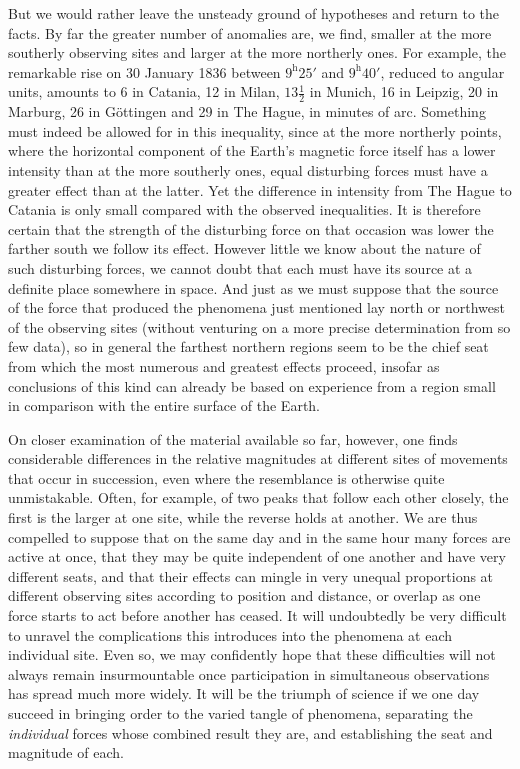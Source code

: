 But we would rather leave the unsteady ground of hypotheses and return to the facts. By far the greater number of anomalies are, we find, smaller at the more southerly observing sites and larger at the more northerly ones. For example, the remarkable rise on 30 January 1836 between $9^{\mathrm h}25'$ and $9^{\mathrm h}40'$, reduced to angular units, amounts to 6 in Catania, 12 in Milan, $13\frac12$ in Munich, 16 in Leipzig, 20 in Marburg, 26 in Göttingen and 29 in The Hague, in minutes of arc. Something must indeed be allowed for in this inequality, since at the more northerly points, where the horizontal component of the Earth’s magnetic force itself has a lower intensity than at the more southerly ones, equal disturbing forces must have a greater effect than at the latter. Yet the difference in intensity from The Hague to Catania is only small compared with the observed inequalities. It is therefore certain that
the strength of the disturbing force on that occasion was lower the farther south we follow its effect. However little we know about the nature of such disturbing forces, we cannot doubt that each must have its source at a definite place somewhere in space. And just as we must suppose that the source of the force that produced the phenomena just mentioned lay north or northwest of the observing sites (without venturing on a more precise determination from so few data), so in general the farthest northern regions seem to be the chief seat from which the most numerous and greatest effects proceed, insofar as conclusions of this kind can already be based on experience from a region small in comparison with the entire surface of the Earth.

On closer examination of the material available so far, however, one finds considerable differences in the relative magnitudes at different sites of movements that occur in succession, even where the resemblance is otherwise quite unmistakable. Often, for example, of two peaks that follow each other closely, the first is the larger at one site, while the reverse holds at another. We are thus compelled to suppose that on the same day and in the same hour many forces are active at once, that they may be quite independent of one another and have very different seats, and that their effects can mingle in very unequal proportions at different observing sites according to position and distance, or overlap as one force starts to act before another has ceased. It will undoubtedly be very difficult to unravel the complications this introduces into the phenomena at each individual site. Even so, we may confidently hope that these difficulties will not always remain insurmountable once participation in simultaneous observations has spread much more widely. It will be the triumph of science if we one day succeed in bringing order to the varied tangle of phenomena, separating the \textit{individual} forces whose combined result they are, and establishing the seat and magnitude of each.

